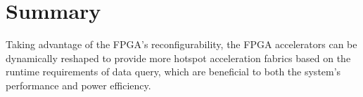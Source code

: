 \documentclass[12pt]{article} %
\begin{document}
\section{Summary} 
Taking advantage of the FPGA's reconfigurability, the FPGA accelerators can be dynamically
reshaped to provide more hotspot acceleration fabrics based on the runtime requirements of data
query, which are beneficial to both the system's performance and power efficiency.



\end{document}
